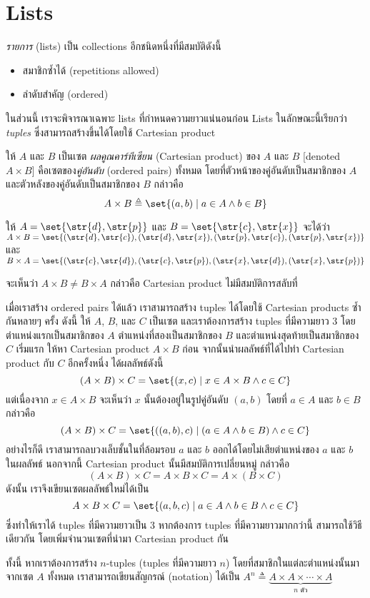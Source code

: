 \section{Lists}
\emph{รายการ} (lists) เป็น collections อีกชนิดหนึ่งที่มีสมบัติดังนี้
\begin{itemize}[]
\item สมาชิกซ้ำได้ (repetitions allowed)
\item ลำดับสำคัญ (ordered)
\end{itemize}
ในส่วนนี้ เราจะพิจารณาเฉพาะ lists ที่กำหนดความยาวแน่นอนก่อน \enskip Lists ในลักษณะนี้เรียกว่า \emph{tuples} ซึ่งสามารถสร้างขึ้นได้โดยใช้ Cartesian product
\begin{definition}
ให้ $A$ และ $B$ เป็นเซต \enskip \emph{ผลคูณคาร์ทีเซียน} (Cartesian product) ของ $A$ และ $B$ [denoted $A\times B$] คือเซตของ\emph{คู่อันดับ} (ordered pairs) ทั้งหมด โดยที่ตัวหน้าของคู่อันดับเป็นสมาชิกของ $A$ และตัวหลังของคู่อันดับเป็นสมาชิกของ $B$ กล่าวคือ
\[A\times B\triangleq\set{(a,b)\mid a\in A\wedge b\in B}\]
\end{definition}
%
\begin{example}\label{ex:Cartesian}
ให้ $A=\set{\str{d},\str{p}}$ และ $B=\set{\str{c},\str{x}}$ จะได้ว่า $A\times B=\set{(\str{d},\str{c}),(\str{d},\str{x}),(\str{p},\str{c}),(\str{p},\str{x})}$ และ $B\times A=\set{(\str{c},\str{d}),(\str{c},\str{p}),(\str{x},\str{d}),(\str{x},\str{p})}$
\end{example}
จะเห็นว่า $A\times B\neq B\times A$ กล่าวคือ Cartesian product ไม่มีสมบัติการสลับที่

เมื่อเราสร้าง ordered pairs ได้แล้ว เราสามารถสร้าง tuples ได้โดยใช้ Cartesian products ซ้ำกันหลายๆ ครั้ง ดังนี้ \enskip ให้ $A$, $B$, และ $C$ เป็นเซต และเราต้องการสร้าง tuples ที่มีความยาว 3 โดยตำแหน่งแรกเป็นสมาชิกของ $A$ ตำแหน่งที่สองเป็นสมาชิกของ $B$ และตำแหน่งสุดท้ายเป็นสมาชิกของ $C$ \enskip เริ่มแรก ให้หา Cartesian product $A\times B$ ก่อน จากนั้นนำผลลัพธ์ที่ได้ไปทำ Cartesian product กับ $C$ อีกครั้งหนึ่ง ได้ผลลัพธ์ดังนี้
\[(A\times B)\times C =\set{(x,c)\mid x\in A\times B\wedge c\in C}\]
แต่เนื่องจาก $x\in A\times B$ จะเห็นว่า $x$ นั้นต้องอยู่ในรูปคู่อันดับ $(a,b)$ โดยที่ $a\in A$ และ $b\in B$ กล่าวคือ
\[(A\times B)\times C =\set{((a,b),c)\mid (a\in A\wedge b\in B)\wedge c\in C}\]
อย่างไรก็ดี เราสามารถลบวงเล็บชั้นในที่ล้อมรอบ $a$ และ $b$ ออกได้โดยไม่เสียตำแหน่งของ $a$ และ $b$ ในผลลัพธ์ \enskip นอกจากนี้ Cartesian product นั้นมีสมบัติการเปลี่ยนหมู่ กล่าวคือ
\[(A\times B)\times C = A\times B\times C = A\times (B\times C)\]
ดังนั้น เราจึงเขียนเซตผลลัพธ์ใหม่ได้เป็น
\[A\times B\times C = \set{(a,b,c)\mid a\in A\wedge b\in B\wedge c\in C}\]
ซึ่งทำให้เราได้ tuples ที่มีความยาวเป็น 3 \enskip หากต้องการ tuples ที่มีความยาวมากกว่านี้ สามารถใช้วิธีเดียวกัน โดยเพิ่มจำนวนเซตที่นำมา Cartesian product กัน

ทั้งนี้ หากเราต้องการสร้าง $n$-tuples (tuples ที่มีความยาว $n$) โดยที่สมาชิกในแต่ละตำแหน่งนั้นมาจากเซต $A$ ทั้งหมด เราสามารถเขียนสัญกรณ์ (notation) ได้เป็น $A^n\triangleq\underbrace{A\times A\times\cdots\times A}_{\textrm{$n$ ตัว}}$

